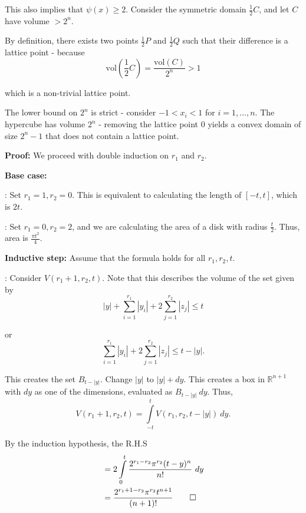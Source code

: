 \documentclass[a4paper, 12pt,oneside,openany]{book}
\begin{document}
This also implies that $\psi(x) \geq 2.$ Consider the symmetric domain $\frac{1}{2}C$, and let $C$ have volume $>2^n.$

By definition, there exists two points $\frac{1}{2}P$ and $\frac{1}{2}Q$ such that their difference is a lattice point - because $$\text{vol}\left(\frac{1}{2}C\right) = \frac{\text{vol}(C)}{2^n}>1$$

which is a non-trivial lattice point. 

The lower bound on $2^n$ is strict - consider $-1 < x_i < 1$ for $i=1, \dots, n.$ The hypercube has volume $2^n$ - removing the lattice point $0$ yields a convex domain of size $2^n-1$ that does not contain a lattice point. 


\textbf{Proof:} We proceed with double induction on $r_1$ and $r_2$.

\textbf{Base case:} 

: Set $r_1 = 1, r_2 = 0$. This is equivalent to calculating the length of $[-t, t]$, which is $2t.$

: Set $r_1 = 0, r_2 =2$, and we are calculating the area of a disk with radius $\frac{t}{2}$. Thus, area is $\frac{\pi t^2}{4}$.

\textbf{Inductive step:} Assume that the formula holds for all $r_1, r_2, t$. 

: Consider $V(r_1+1, r_2, t)$. Note that this describes the volume of the set given by $$|y|+\sum\limits_{i=1}^{r_1} |y_i| + 2 \sum\limits_{j=1}^{r_2} |z_j| \leq t$$

or $$\sum\limits_{i=1}^{r_1} |y_i| + 2 \sum\limits_{j=1}^{r_2} |z_j| \leq t-|y|.$$

This creates the set $B_{t-|y|}.$ Change $|y|$ to $|y| + dy.$ This creates a box in $\mathbb{R}^{n+1}$ with $dy$ as one of the dimensions, evaluated as $B_{t-|y|}\ dy.$ Thus, $$V(r_1+1, r_2, t) = \int\limits_{-t}^t V(r_1, r_2, t-|y|) \ dy.$$ 

By the induction hypothesis, the R.H.S \begin{align*}
&=2\int\limits_{0}^{t}\frac{2^{r_1-r_2}\pi^{r_2}(t-y)^n}{n!} \ dy \\
&=\frac{2^{r_1+1-r_2}\pi^{r_2}t^{n+1}}{(n+1)!} \qed
\end{align*}
\end{document}
